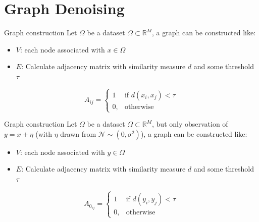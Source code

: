 \documentclass[aspectratio=169]{beamer}
\begin{document}
\section{Graph Denoising}

\begin{frame}{Graph construction}
    Let $\Omega$ be a dataset $\Omega \subset \mathbb{R}^M$, a graph can be constructed like:
    \begin{itemize}
        \item $V$: each node associated with $x \in \Omega$
        \item $E$: Calculate adjacency matrix with similarity measure $d$ and some threshold $\tau$
     \end{itemize}

     \begin{definition}
        \begin{equation}
            \label{eq:graphConstruction}
            A_{ij} =    
            \begin{cases}
                1  & \text{if } d(x_i, x_j) < \tau\\
                0, & \text{otherwise}
            \end{cases}
        \end{equation}
    \end{definition}
\end{frame}

\begin{frame}{Graph construction}
    Let $\Omega$ be a dataset $\Omega \subset \mathbb{R}^M$, but only observation 
    of $y = x + \eta$ (with $\eta$ drawn from $\mathcal{N} \sim (0, \sigma^2)$), 
    a graph can be constructed like:
    \begin{itemize}
        \item $V$: each node associated with $y \in \Omega$
        \item $E$: Calculate adjacency matrix with similarity measure $d$ and some threshold $\tau$
     \end{itemize}
     \begin{definition}
        \begin{equation}
            \label{eq:graphConstructionNoise}
            A_{0_{ij}} =    
            \begin{cases}
                1  & \text{if } d(y_i, y_j) < \tau\\
                0, & \text{otherwise}
            \end{cases}
        \end{equation}    
     \end{definition}
\end{frame}
\end{document}
